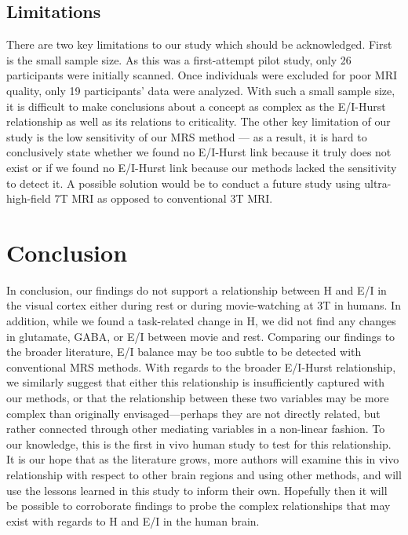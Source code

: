 \documentclass[
true
]{sn-jnl}
\begin{document}
\subsection{Limitations}\label{limitations}

There are two key limitations to our study which should be acknowledged.
First is the small sample size. As this was a first-attempt pilot study,
only 26 participants were initially scanned. Once individuals were
excluded for poor MRI quality, only 19 participants' data were analyzed.
With such a small sample size, it is difficult to make conclusions about
a concept as complex as the E/I-Hurst relationship as well as its
relations to criticality. The other key limitation of our study is the
low sensitivity of our MRS method --- as a result, it is hard to
conclusively state whether we found no E/I-Hurst link because it truly
does not exist or if we found no E/I-Hurst link because our methods
lacked the sensitivity to detect it. A possible solution would be to
conduct a future study using ultra-high-field 7T MRI as opposed to
conventional 3T MRI.

\section{Conclusion}\label{conclusion}

In conclusion, our findings do not support a relationship between H and
E/I in the visual cortex either during rest or during movie-watching at
3T in humans. In addition, while we found a task-related change in H, we
did not find any changes in glutamate, GABA, or E/I between movie and
rest. Comparing our findings to the broader literature, E/I balance may
be too subtle to be detected with conventional MRS methods. With regards
to the broader E/I-Hurst relationship, we similarly suggest that either
this relationship is insufficiently captured with our methods, or that
the relationship between these two variables may be more complex than
originally envisaged---perhaps they are not directly related, but rather
connected through other mediating variables in a non-linear fashion. To
our knowledge, this is the first in vivo human study to test for this
relationship. It is our hope that as the literature grows, more authors
will examine this in vivo relationship with respect to other brain
regions and using other methods, and will use the lessons learned in
this study to inform their own. Hopefully then it will be possible to
corroborate findings to probe the complex relationships that may exist
with regards to H and E/I in the human brain.


  
\end{document}
